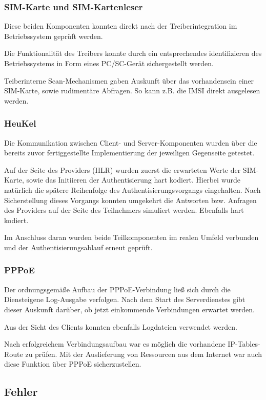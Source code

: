 		\subsubsection{SIM-Karte und SIM-Kartenleser}
		Diese beiden Komponenten konnten direkt nach der Treiberintegration im Betriebssystem
		geprüft werden.

		Die Funktionalität des Treibers konnte durch ein entsprechendes identifizieren des
		Betriebssystems in Form eines PC/SC-Gerät sichergestellt werden.

		Teiberinterne Scan-Mechanismen gaben Auskunft über das vorhandensein einer SIM-Karte,
		sowie rudimentäre Abfragen. So kann z.B. die IMSI direkt ausgelesen werden.

		\subsubsection{HeuKel}
		Die Kommunikation zwischen Client- und Server-Komponenten wurden über die bereits zuvor
		fertiggestellte Implementierung der jeweiligen Gegenseite getestet.

		Auf der Seite des Providers (HLR) wurden zuerst die erwarteten Werte der SIM-Karte, sowie
		das Initiieren der Authentisierung hart kodiert. Hierbei wurde natürlich die spätere
		Reihenfolge des Authentisierungsvorgangs eingehalten. Nach Sicherstellung dieses Vorgangs
		konnten umgekehrt die Antworten bzw. Anfragen des Providers auf der Seite des Teilnehmers
		simuliert werden. Ebenfalls hart kodiert.

		Im Anschluss daran wurden beide Teilkomponenten im realen Umfeld verbunden und der
		Authentisierungsablauf erneut geprüft.

		\subsubsection{PPPoE}
		Der ordnungsgemäße Aufbau der PPPoE-Verbindung ließ sich durch die Diensteigene
		Log-Ausgabe verfolgen. Nach dem Start des Serverdienstes gibt dieser Auskunft
		darüber, ob jetzt einkommende Verbindungen erwartet werden.

		Aus der Sicht des Clients konnten ebenfalls Logdateien verwendet werden.

		Nach erfolgreichem Verbindungsaufbau war es möglich die vorhandene
		IP-Tables-Route zu prüfen. Mit der Auslieferung von Ressourcen aus
		dem Internet war auch diese Funktion über PPPoE sicherzustellen.

	\subsection{Fehler}
	\label{subsec:fehler}
